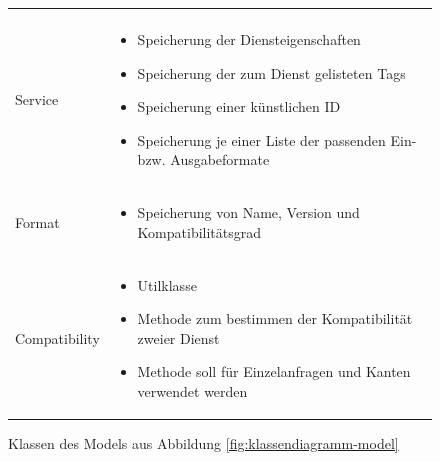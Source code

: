 \begin{figure}[h]
\begin{tabularx}{\textwidth}{p{} | X}
\begin{itemize}
		\end{itemize} \\
		Service & \compress \begin{itemize}
			\item Speicherung der Diensteigenschaften
			\item Speicherung der zum Dienst gelisteten Tags
			\item Speicherung einer künstlichen ID
			\item Speicherung je einer Liste der passenden Ein- bzw. Ausgabeformate
		\end{itemize} \\
		\rowcolor[HTML]{E7E7E7}
		Format & \compress \begin{itemize}
			\item Speicherung von Name, Version und Kompatibilitätsgrad
		\end{itemize} \\
		Compatibility & \compress \begin{itemize}
			\item Utilklasse
			\item Methode zum bestimmen der Kompatibilität zweier Dienst
			\item Methode soll für Einzelanfragen und Kanten verwendet werden
		\end{itemize} 
	\end{tabularx}
	\caption{Klassen des Models aus Abbildung \ref{fig:klassendiagramm-model}}
	\label{table:klassenbeschreibung-a}
\end{figure}


